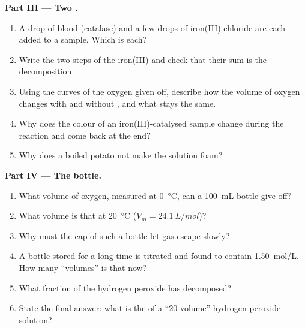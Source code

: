 \begin{problem}
\medskip
\noindent\textbf{Part III --- Two .}
\begin{enumerate}[resume]
  \item A drop of blood (catalase) and a few drops of iron(III) chloride
        are each added to a sample. Which  is each?
  \item Write the two steps of the iron(III)  and check that
        their sum is the decomposition.
  \item Using the curves of the oxygen given off, describe how the volume
        of oxygen changes with and without , and what stays the
        same.
  \item Why does the colour of an iron(III)-catalysed sample change during
        the reaction and come back at the end?
  \item Why does a boiled potato not make the solution foam?
\end{enumerate}

\medskip
\noindent\textbf{Part IV --- The bottle.}
\begin{enumerate}[resume]
  \item What volume of oxygen, measured at \qty{0}{\celsius}, can a
        \qty{100}{mL} bottle give off?
  \item What volume is that at \qty{20}{\celsius} ($V_m =
        \qty{24.1}{L/mol}$)?
  \item Why must the cap of such a bottle let gas escape slowly?
  \item A bottle stored for a long time is titrated and found to contain
        \qty{1.50}{mol/L}. How many ``volumes'' is that now?
  \item What fraction of the hydrogen peroxide has decomposed?
  \item State the final answer: what is the  of a
        ``20-volume'' hydrogen peroxide solution?
\end{enumerate}
\end{problem}
